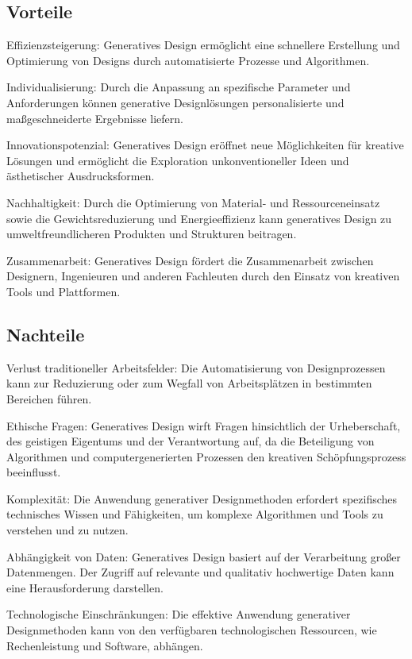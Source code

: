 \subsection*{Vorteile}
 Effizienzsteigerung: Generatives Design ermöglicht eine schnellere Erstellung und Optimierung von Designs durch automatisierte Prozesse und Algorithmen.
 
 Individualisierung: Durch die Anpassung an spezifische Parameter und Anforderungen können generative Designlösungen personalisierte und maßgeschneiderte Ergebnisse liefern.
 
 Innovationspotenzial: Generatives Design eröffnet neue Möglichkeiten für kreative Lösungen und ermöglicht die Exploration unkonventioneller Ideen und ästhetischer Ausdrucksformen.
 
 Nachhaltigkeit: Durch die Optimierung von Material- und Ressourceneinsatz sowie die Gewichtsreduzierung und Energieeffizienz kann generatives Design zu umweltfreundlicheren Produkten und Strukturen beitragen.
 
 Zusammenarbeit: Generatives Design fördert die Zusammenarbeit zwischen Designern, Ingenieuren und anderen Fachleuten durch den Einsatz von kreativen Tools und Plattformen. \autocite{12} \autocite*{13}
 
 \subsection*{Nachteile}
 Verlust traditioneller Arbeitsfelder: Die Automatisierung von Designprozessen kann zur Reduzierung oder zum Wegfall von Arbeitsplätzen in bestimmten Bereichen führen.
 
 Ethische Fragen: Generatives Design wirft Fragen hinsichtlich der Urheberschaft, des geistigen Eigentums und der Verantwortung auf, da die Beteiligung von Algorithmen und computergenerierten Prozessen den kreativen Schöpfungsprozess beeinflusst.
 
 Komplexität: Die Anwendung generativer Designmethoden erfordert spezifisches technisches Wissen und Fähigkeiten, um komplexe Algorithmen und Tools zu verstehen und zu nutzen.
 
 Abhängigkeit von Daten: Generatives Design basiert auf der Verarbeitung großer Datenmengen. Der Zugriff auf relevante und qualitativ hochwertige Daten kann eine Herausforderung darstellen.
 
 Technologische Einschränkungen: Die effektive Anwendung generativer Designmethoden kann von den verfügbaren technologischen Ressourcen, wie Rechenleistung und Software, abhängen. \autocite*{13}

